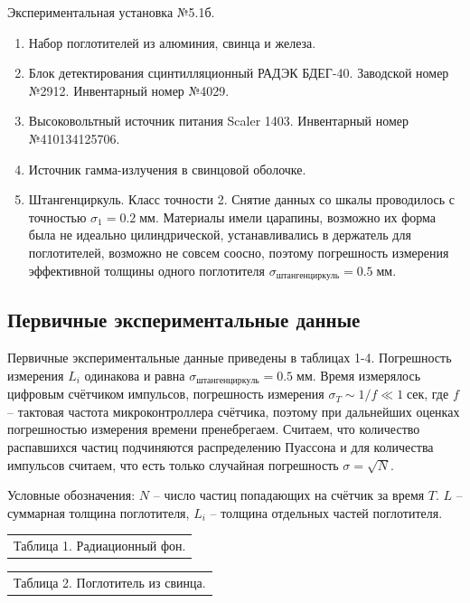 \documentclass[10pt,a4paper]{article}
\newcommand{\mm}{\; мм}
\begin{document}
	Экспериментальная установка №5.1б.
	
	\begin{enumerate}
		\item Набор поглотителей из алюминия, свинца и железа.
		
		\item Блок детектирования сцинтилляционный РАДЭК БДЕГ-40. Заводской номер №2912. Инвентарный номер №4029.
		
		\item Высоковольтный источник питания Scaler 1403. Инвентарный номер №410134125706.
		
		\item Источник гамма-излучения в свинцовой оболочке.
		
		\item Штангенциркуль. Класс точности 2. Снятие данных со шкалы проводилось с точностью $\sigma_1 = 0.2 \mm$. Материалы имели царапины, возможно их форма была не идеально цилиндрической, устанавливались в держатель для поглотителей, возможно не совсем соосно, поэтому погрешность измерения эффективной толщины одного поглотителя $\sigma_{штангенциркуль} = 0.5 \mm$.
	\end{enumerate}
	
	\subsection*{Первичные экспериментальные данные}
	
	Первичные экспериментальные данные приведены в таблицах 1-4. Погрешность измерения $L_i$ одинакова и равна $\sigma_{штангенциркуль} = 0.5 \mm$. Время измерялось цифровым счётчиком импульсов, погрешность измерения $\sigma_T \sim 1/f \ll 1 \; сек$, где $f$ -- тактовая частота микроконтроллера счётчика, поэтому при дальнейших оценках погрешностью измерения времени пренебрегаем. Считаем, что количество распавшихся частиц подчиняются распределению Пуассона и для количества импульсов считаем, что есть только случайная погрешность $\sigma = \sqrt{N}$.
	
	Условные обозначения: $N$ -- число частиц попадающих на счётчик за время $T$. $L$ -- суммарная толщина поглотителя, $L_i$ -- толщина отдельных частей поглотителя.
	
	\begin{multicols}{2}
		\begin{tabular}[t]{l}
			Таблица 1. Радиационный фон. \\
			
		\end{tabular}
		
		\begin{tabular}[t]{l}
			Таблица 2. Поглотитель из свинца. \\
			
		\end{tabular} 
	\end{multicols}
	
\end{document}

